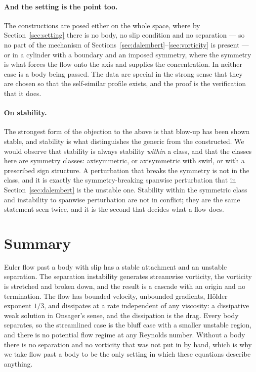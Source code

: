 \documentclass[11pt]{article}
\begin{document}
\paragraph{And the setting is the point too.} The constructions are posed either on the whole space,
where by Section~\ref{sec:setting} there is no body, no slip condition and no separation --- so no
part of the mechanism of Sections~\ref{sec:dalembert}--\ref{sec:vorticity} is present --- or in a
cylinder with a boundary and an imposed symmetry, where the symmetry is what forces the flow onto
the axis and supplies the concentration. In neither case is a body being passed. The data are
special in the strong sense that they are chosen so that the self-similar profile exists, and the
proof is the verification that it does.

\paragraph{On stability.} The strongest form of the objection to the above is that blow-up has been
shown stable, and stability is what distinguishes the generic from the constructed. We would
observe that stability is always stability \emph{within} a class, and that the classes here are
symmetry classes: axisymmetric, or axisymmetric with swirl, or with a prescribed sign structure.
A perturbation that breaks the symmetry is not in the class, and it is exactly the symmetry-breaking
spanwise perturbation that in Section~\ref{sec:dalembert} is the unstable one. Stability within the
symmetric class and instability to spanwise perturbation are not in conflict; they are the same
statement seen twice, and it is the second that decides what a flow does.

\section{Summary}\label{sec:summary}

Euler flow past a body with slip has a stable attachment and an unstable separation. The separation
instability generates streamwise vorticity, the vorticity is stretched and broken down, and the
result is a cascade with an origin and no termination. The flow has bounded velocity, unbounded
gradients, H\"older exponent $1/3$, and dissipates at a rate independent of any viscosity: a
dissipative weak solution in Onsager's sense, and the dissipation is the drag. Every body separates,
so the streamlined case is the bluff case with a smaller unstable region, and there is no potential
flow regime at any Reynolds number. Without a body there is no separation and no vorticity that was
not put in by hand, which is why we take flow past a body to be the only setting in which these
equations describe anything.
\end{document}
